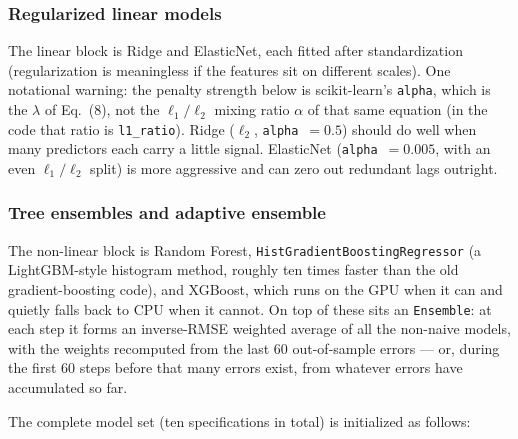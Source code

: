 \subsubsection{Regularized linear models}

The linear block is Ridge and ElasticNet, each fitted after standardization (regularization is meaningless if the features sit on different scales). One notational warning: the penalty strength below is scikit-learn's \texttt{alpha}, which is the $\lambda$ of Eq.~(8), not the $\ell_1/\ell_2$ mixing ratio $\alpha$ of that same equation (in the code that ratio is \texttt{l1\_ratio}). Ridge ($\ell_2$, \texttt{alpha}~$= 0.5$) should do well when many predictors each carry a little signal. ElasticNet (\texttt{alpha}~$= 0.005$, with an even $\ell_1/\ell_2$ split) is more aggressive and can zero out redundant lags outright.

\subsubsection{Tree ensembles and adaptive ensemble}

The non-linear block is Random Forest, \texttt{HistGradientBoostingRegressor} (a LightGBM-style histogram method, roughly ten times faster than the old gradient-boosting code), and XGBoost, which runs on the GPU when it can and quietly falls back to CPU when it cannot. On top of these sits an \texttt{Ensemble}: at each step it forms an inverse-RMSE weighted average of all the non-naive models, with the weights recomputed from the last 60 out-of-sample errors --- or, during the first 60 steps before that many errors exist, from whatever errors have accumulated so far.

The complete model set (ten specifications in total) is initialized as follows:

